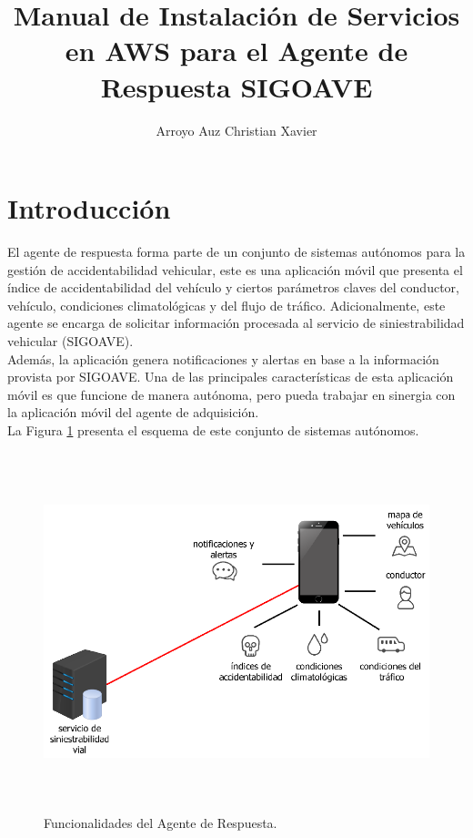 \documentclass[a4paper,10pt, oneside, titlepage]{article}
\title{Manual de Instalación de Servicios en AWS para el Agente de Respuesta SIGOAVE}
\author{Arroyo Auz Christian Xavier}
\date{}
\begin{document}
	\maketitle
	\section{Introducción}
	El agente de respuesta forma parte de un conjunto de sistemas autónomos para la gestión de accidentabilidad vehicular, este es una aplicación móvil que presenta el índice de accidentabilidad del vehículo y ciertos parámetros claves del conductor, vehículo, condiciones climatológicas y del flujo de tráfico. Adicionalmente, este agente se encarga de solicitar información procesada al servicio de siniestrabilidad vehicular (SIGOAVE). \\\newline
	\indent Además, la aplicación genera notificaciones y alertas en base a la información provista por SIGOAVE. Una de las principales características de esta aplicación móvil es que funcione de manera autónoma, pero pueda trabajar en sinergia con la aplicación móvil del agente de adquisición. \\\newline
	\indent La Figura \ref{Funcionalidad} presenta el esquema de este conjunto de sistemas autónomos.
	\begin{figure}[!h]
		\centering
		\includegraphics[width = 1\linewidth, height = 10.4cm]{Funcionalidad.png}
		\caption{Funcionalidades del Agente de Respuesta.}
		\label{Funcionalidad}
	\end{figure} \\
\end{document}
